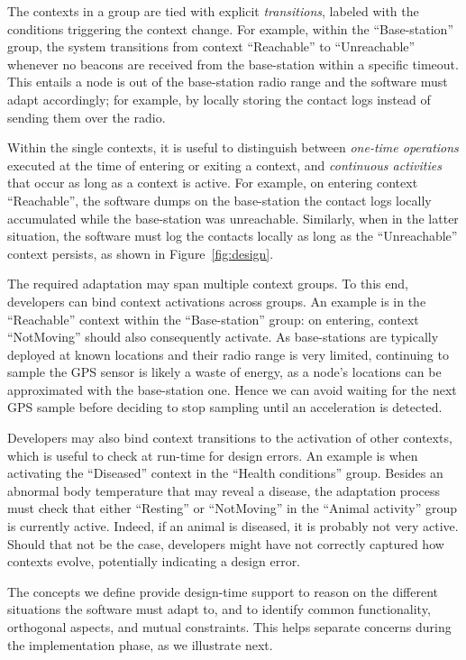 The contexts in a group are tied with explicit \emph{transitions},
labeled with the conditions triggering the context change. For
example, within the ``Base-station'' group, the system transitions
from context ``Reachable'' to ``Unreachable'' whenever no beacons are
received from the base-station within a specific timeout. This entails
a node is out of the base-station radio range and the software must
adapt accordingly; for example, by locally storing the contact logs
instead of sending them over the radio.

Within the single contexts, it is useful to distinguish between
\emph{one-time operations} executed at the time of entering or exiting
a context, and \emph{continuous activities} that occur as long as a
context is active. For example, on entering context ``Reachable'', the
software dumps on the base-station the contact logs locally
accumulated while the base-station was unreachable. Similarly, when in
the latter situation, the software must log the contacts locally as
long as the ``Unreachable'' context persists, as shown in
Figure~\ref{fig:design}.

The required adaptation may span multiple context
groups. To this end, developers can bind context activations across
groups. An example is in the ``Reachable'' context within the
``Base-station'' group: on entering, context ``NotMoving'' should
also consequently activate. As base-stations are typically deployed at
known locations and their radio range is very limited, continuing
to sample the GPS sensor is likely a waste of energy, as a node's
locations can be approximated with the base-station one. Hence we can
avoid waiting for the next GPS sample before deciding to stop
sampling until an acceleration is detected.

Developers may also bind context transitions to the activation of
other contexts, which is useful to check at run-time for design
errors. An example is when activating the ``Diseased'' context in the
``Health conditions'' group. Besides an abnormal body temperature that
may reveal a disease, the adaptation process must check that either
``Resting'' or ``NotMoving'' in the ``Animal activity'' group is
currently active. Indeed, if an animal is diseased, it is probably not
very active. Should that not be the case, developers might have not
correctly captured how contexts evolve, potentially indicating a
design error.

The concepts we define provide design-time support to reason on the
different situations the software must adapt to, and to identify
common functionality, orthogonal aspects, and mutual constraints. This
helps separate concerns during the implementation phase, as we
illustrate next.



